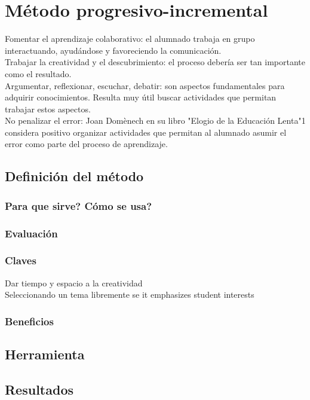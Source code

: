 \chapter{M\'etodo progresivo-incremental}
Fomentar el aprendizaje colaborativo: el alumnado trabaja en grupo interactuando, ayud\'andose y favoreciendo la comunicaci\'on.\\


Trabajar la creatividad y el descubrimiento: el proceso debería ser tan importante como el resultado.\\
Argumentar, reflexionar, escuchar, debatir: son aspectos fundamentales para adquirir conocimientos. Resulta muy útil buscar actividades que permitan 
trabajar estos aspectos.\\
No penalizar el error: Joan Domènech en su libro  "Elogio de la Educación Lenta"1 considera positivo organizar actividades que permitan al alumnado asumir 
el error como parte del proceso de aprendizaje.



\section{Definici\'on del m\'etodo}

\subsection{Para que sirve? C\'omo se usa?}
\subsection{Evaluaci\'on}
\subsection{Claves}
Dar tiempo y espacio a la creatividad\\
Seleccionando un tema libremente se it emphasizes student interests

\subsection{Beneficios}

\section{Herramienta}\label{ch1:opts}

\section{Resultados}


